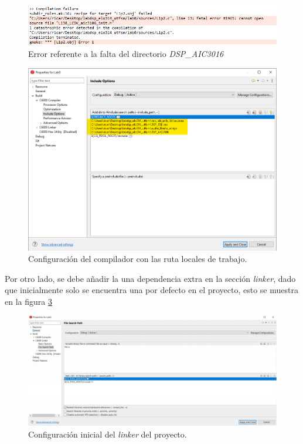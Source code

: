 \begin{enumerate}
    \begin{figure}[H]
        \centering
        \includegraphics[scale = 0.8]{figures/error_aic3106.png}
        \caption{Error referente a la falta del directorio \textit{DSP\_AIC3016}}
        \label{error}
    \end{figure}
    \begin{figure}[H]
        \centering
        \includegraphics[scale = 0.5]{figures/path_local.png}
        \caption{Configuración del compilador con las ruta locales de trabajo.}
        \label{path_local}
    \end{figure}
    
    
    Por otro lado, se debe añadir la una dependencia extra en la sección \textit{linker}, dado que inicialmente solo se encuentra una por defecto en el proyecto, esto se muestra en la figura \ref{liker}
    
    \begin{figure}[H]
        \centering
\includegraphics[scale = 0.3]{figures/linker_profe.png}
        \caption{Configuración inicial del \textit{linker} del proyecto.}
        \label{liker}
    \end{figure}
    

\end{enumerate}

